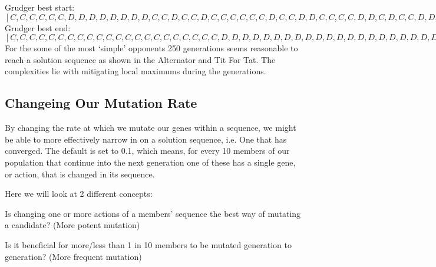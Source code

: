     Grudger best start:\([C, C, C, C, C, C, D, D, D, D, D, D, D, D, C, C, D, C, C, D, C, C, C, C, C, C, D, C, C, D, D, C, C, C, C, D, D, C, D, C, C, D, D, D, D, D, D, D, D, D, D, C, D, C, D, D, D, C, D, D, D, C, D, C, D, C, C, D, D, C, D, C, D, D, C, C, C, D, D, D, D, D, C, C, D, D, C, C, D, C, D, D, C, D, C, C, C, C, D, C, C, D, C, D, C, C, D, D, D, C, D, C, C, D, D, C, D, D, D, D, D, D, D, C, C, C, D, D, C, D, D, C, C, C, D, C, D, D, D, D, D, C, D, C, D, C, D, C, D, C, D, C, C, C, C, D, C, D, C, D, D, D, D, C, C, D, C, D, D, D, C, D, C, C, D, D, D, C, C, C, C, D, C, D, D, D, C, C, D, D, D, D, C, C, D, C, C, D, D, D]\)\\ 

    Grudger best end:\([C, C, C, C, C, C, C, C, C, C, C, C, C, C, C, C, C, C, C, C, C, C, D, D, D, D, D, D, D, D, D, D, D, D, D, D, D, D, D, D, D, D, D, D, D, D, D, D, D, D, D, D, D, D, D, D, D, D, D, D, D, D, D, D, D, D, D, D, D, D, D, D, D, D, D, D, D, D, D, D, D, D, D, D, D, D, D, D, D, D, D, D, D, D, D, D, D, D, D, D, D, D, D, D, D, D, D, D, D, D, D, D, D, D, D, D, D, D, D, D, D, D, D, D, D, D, D, D, D, D, D, D, D, D, D, D, D, D, D, D, D, D, D, D, D, D, D, D, D, D, D, D, D, D, D, D, D, D, D, D, D, D, D, D, D, D, D, D, D, D, D, D, D, D, D, D, D, D, D, D, D, D, D, D, D, D, D, D, D, D, D, D, D, D, D, D, D, D, D, D]\)\\
    

    For the some of the most `simple' opponents 250 generations seems reasonable to reach a solution sequence as shown in the Alternator and Tit For Tat. The complexities lie with mitigating local maximums during the generations.\\
    
    \subsection{Changeing Our Mutation Rate}
    By changing the rate at which we mutate our genes within a sequence, we might be able to more effectively narrow in on a solution sequence, i.e. One that has converged. The default is set to 0.1, which means, for every 10 members of our population that continue into the next generation one of these has a single gene, or action, that is changed in its sequence. 
    
    Here we will look at 2 different concepts:
    \begin{itemize}
        \begin{item}
            Is changing one or more actions of a members' sequence the best way of mutating a candidate? (More potent mutation)
        \end{item}
        \begin{item}
            Is it beneficial for more/less than 1 in 10 members to be mutated generation to generation? (More frequent mutation)
        \end{item}
    \end{itemize}
    
